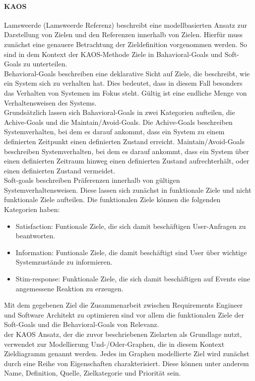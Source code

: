 \paragraph{KAOS}
Lamsweerde (Lamsweerde Referenz) beschreibt eine modellbasierten Ansatz zur Darstellung von Zielen und den Referenzen innerhalb von Zielen. Hierfür muss zunächst eine genauere Betrachtung der Zieldefinition vorgenommen werden. So sind in dem Kontext der KAOS-Methode Ziele in Bahavioral-Goals und Soft-Goals zu unterteilen. \\
Behavioral-Goals beschreiben eine deklarative Sicht auf Ziele, die beschreibt, wie ein System sich zu verhalten hat. Dies bedeutet, dass in diesem Fall besonders das Verhalten von Systemen im Fokus steht. Gültig ist eine endliche Menge von Verhaltensweisen des Systems. \\
Grundsätzlich lassen sich Bahavioral-Goals in zwei Kategorien aufteilen, die Achive-Goals und die Maintain/Avoid-Goals. Die Achive-Goals beschreiben Systemverhalten, bei dem es darauf ankommt, dass ein System zu einem definierten Zeitpunkt einen definierten Zustand erreicht. Maintain/Avoid-Goals beschreiben Systemverhalten, bei dem es darauf ankommt, dass ein System über einen definierten Zeitraum hinweg einen definierten Zustand aufrechterhält, oder einen definierten Zustand vermeidet.\\
Soft-goals beschreiben Präferenzen innerhalb von gültigen Systemverhaltensweisen. Diese lassen sich zunächst in funktionale Ziele und nicht funktionale Ziele aufteilen. Die funktionalen Ziele können die folgenden Kategorien haben:
\begin{itemize}
\item Satisfaction: Funtionale Ziele, die sich damit beschäftigen User-Anfragen zu beantworten.
\item Information: Funtionale Ziele, die damit beschäftigt sind User über wichtige Systemzustände zu informieren.
\item Stim-response: Funktionale Ziele, die sich damit beschäftigen auf Events eine angemessene Reaktion zu erzeugen.
\end{itemize}
Mit dem gegebenen Ziel die Zusammenarbeit zwischen Requirements Engineer und Software Architekt zu optimieren sind vor allem die funktionalen Ziele der Soft-Goals und die Behavioral-Goals von Relevanz.\\
der KAOS Ansatz, der die zuvor beschriebenen Zielarten als Grundlage nutzt, verwendet zur Modellierung Und-/Oder-Graphen, die in diesem Kontext Zieldiagramm genannt werden. Jedes im Graphen modellierte Ziel wird zunächst durch eine Reihe von Eigenschaften charakterisiert. Diese können unter anderem Name, Definition, Quelle, Zielkategorie und Priorität sein.\\

